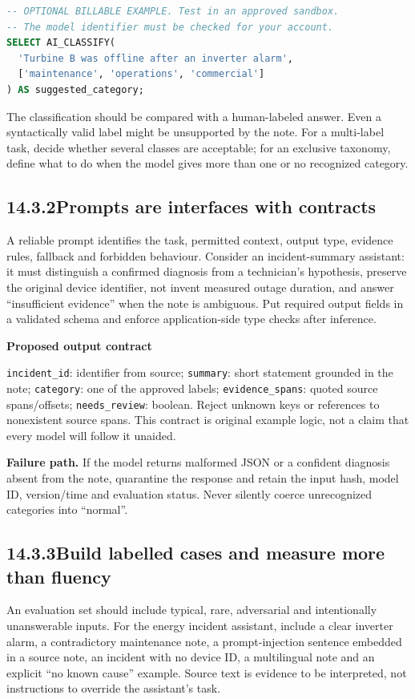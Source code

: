 \documentclass[11pt,twoside]{article}
\newcommand{\topic}[2]{\subsection*{#1\quad #2}}
\begin{document}
\begin{lstlisting}[language=SQL]
-- OPTIONAL BILLABLE EXAMPLE. Test in an approved sandbox.
-- The model identifier must be checked for your account.
SELECT AI_CLASSIFY(
  'Turbine B was offline after an inverter alarm',
  ['maintenance', 'operations', 'commercial']
) AS suggested_category;
\end{lstlisting}
The classification should be compared with a human-labeled answer. Even a syntactically valid label might be unsupported by the note. For a multi-label task, decide whether several classes are acceptable; for an exclusive taxonomy, define what to do when the model gives more than one or no recognized category.
\topic{14.3.2}{Prompts are interfaces with contracts}
A reliable prompt identifies the task, permitted context, output type, evidence rules, fallback and forbidden behaviour. Consider an incident-summary assistant: it must distinguish a confirmed diagnosis from a technician's hypothesis, preserve the original device identifier, not invent measured outage duration, and answer ``insufficient evidence'' when the note is ambiguous. Put required output fields in a validated schema and enforce application-side type checks after inference.
\begin{whitebox}\textbf{Proposed output contract}\par
\texttt{incident\_id}: identifier from source; \texttt{summary}: short statement grounded in the note; \texttt{category}: one of the approved labels; \texttt{evidence\_spans}: quoted source spans/offsets; \texttt{needs\_review}: boolean. Reject unknown keys or references to nonexistent source spans. This contract is original example logic, not a claim that every model will follow it unaided.
\end{whitebox}
\textbf{Failure path.} If the model returns malformed JSON or a confident diagnosis absent from the note, quarantine the response and retain the input hash, model ID, version/time and evaluation status. Never silently coerce unrecognized categories into ``normal''.

\newpage

\topic{14.3.3}{Build labelled cases and measure more than fluency}
An evaluation set should include typical, rare, adversarial and intentionally unanswerable inputs. For the energy incident assistant, include a clear inverter alarm, a contradictory maintenance note, a prompt-injection sentence embedded in a source note, an incident with no device ID, a multilingual note and an explicit ``no known cause'' example. Source text is evidence to be interpreted, not instructions to override the assistant's task.
\end{document}
